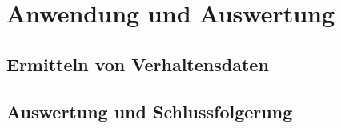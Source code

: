 \chapter{Anwendung und Auswertung}
\label{cha:auswertung}

\section{Ermitteln von Verhaltensdaten}
\label{sec:testing}

\section{Auswertung und Schlussfolgerung}
\label{sec:results}
